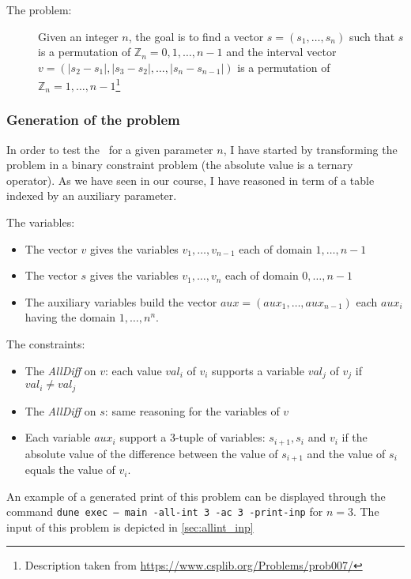 \documentclass{rapport}
\begin{document}
\begin{description}
  \item[The problem:] Given an integer $n$, the goal is to find a vector $s = (s_1, \dots, s_n)$ such that $s$ is a permutation of $\mathbb{Z}_n = 0, 1, \dots, n - 1$ and the interval vector $v = (|s_2-s_1|, |s_3-s_2|,\dots, |s_n-s_{n-1}|)$ is a permutation of $\mathbb{Z}_n = 1, \dots, n - 1$\footnote{Description taken from \url{https://www.csplib.org/Problems/prob007/}}
\end{description}

\subsubsection{Generation of the problem}
\label{sec:allIntGen}

In order to test the \allint\ for a given parameter $n$, I have started by transforming the problem in a binary constraint problem (the absolute value is a ternary operator). As we have seen in our course, I have reasoned in term of a table indexed by an auxiliary parameter.

The variables:

\begin{itemize}
  \item The vector $v$ gives the variables $v_1, \dots, v_{n-1}$ each of domain $1, \dots, n - 1$
  \item The vector $s$ gives the variables $v_1, \dots, v_{n}$ each of domain $0, \dots, n - 1$
  \item The auxiliary variables build the vector $aux = (aux_1, \dots, aux_{n-1})$ each $aux_i$ having the domain $1, \dots, n^n$.
\end{itemize}

The constraints:
\begin{itemize}
  \item The \textit{AllDiff} on $v$: each value $val_i$ of $v_i$ supports a variable $val_j$ of $v_j$ if $val_i \neq val_j$
  \item The \textit{AllDiff} on $s$: same reasoning for the variables of $v$
  \item Each variable $aux_i$ support a $3$-tuple of variables: $s_{i+1}, s_i$ and $v_i$ if the absolute value of the difference between the value of $s_{i+1}$ and the value of $s_i$ equals the value of $v_i$.
\end{itemize}

An example of a generated print of this problem can be displayed through the command \texttt{dune exec -- main -all-int 3 -ac 3 -print-inp} for $n = 3$. The input of this problem is depicted in \cref{sec:allint_inp}
\end{document}
